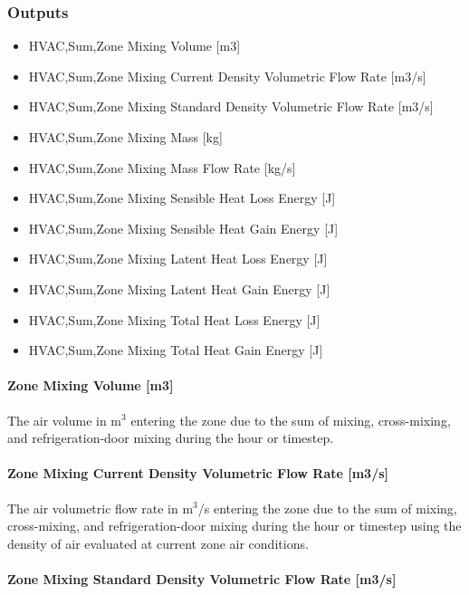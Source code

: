 \subsubsection{Outputs}\label{outputs-4-000}

\begin{itemize}
\item
  HVAC,Sum,Zone Mixing Volume {[}m3{]}
\item
  HVAC,Sum,Zone Mixing Current Density Volumetric Flow Rate {[}m3/s{]}
\item
  HVAC,Sum,Zone Mixing Standard Density Volumetric Flow Rate {[}m3/s{]}
\item
  HVAC,Sum,Zone Mixing Mass {[}kg{]}
\item
  HVAC,Sum,Zone Mixing Mass Flow Rate {[}kg/s{]}
\item
  HVAC,Sum,Zone Mixing Sensible Heat Loss Energy {[}J{]}
\item
  HVAC,Sum,Zone Mixing Sensible Heat Gain Energy {[}J{]}
\item
  HVAC,Sum,Zone Mixing Latent Heat Loss Energy {[}J{]}
\item
  HVAC,Sum,Zone Mixing Latent Heat Gain Energy {[}J{]}
\item
  HVAC,Sum,Zone Mixing Total Heat Loss Energy {[}J{]}
\item
  HVAC,Sum,Zone Mixing Total Heat Gain Energy {[}J{]}
\end{itemize}

\paragraph{Zone Mixing Volume {[}m3{]}}\label{zone-mixing-volume-m3-1}

The air volume in m\(^{3}\) entering the zone due to the sum of mixing, cross-mixing, and refrigeration-door mixing during the hour or timestep.

\paragraph{Zone Mixing Current Density Volumetric Flow Rate {[}m3/s{]}}\label{zone-mixing-current-density-volumetric-flow-rate-m3s-1}

The air volumetric flow rate in m\(^{3}\)/s entering the zone due to the sum of mixing, cross-mixing, and refrigeration-door mixing during the hour or timestep using the density of air evaluated at current zone air conditions.

\paragraph{Zone Mixing Standard Density Volumetric Flow Rate {[}m3/s{]}}\label{zone-mixing-standard-density-volumetric-flow-rate-m3s-1}

